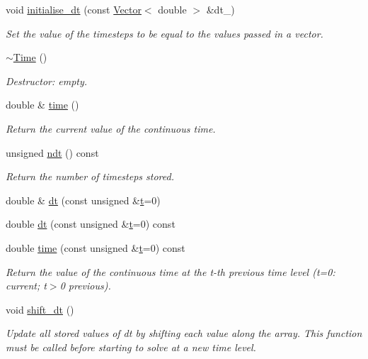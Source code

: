 \begin{DoxyCompactItemize}
void \hyperlink{classoomph_1_1Time_a7c0e382ecec0abb600c36bc5a0820a43}{initialise\+\_\+dt} (const \hyperlink{classoomph_1_1Vector}{Vector}$<$ double $>$ \&dt\+\_\+)
\begin{DoxyCompactList}\small\item\em Set the value of the timesteps to be equal to the values passed in a vector. \end{DoxyCompactList}\item 
\hyperlink{classoomph_1_1Time_aeed85387263214e97be21e075a06371c}{$\sim$\+Time} ()
\begin{DoxyCompactList}\small\item\em Destructor\+: empty. \end{DoxyCompactList}\item 
double \& \hyperlink{classoomph_1_1Time_a6e28ea7a6664a2f5f5e1be871304a2c7}{time} ()
\begin{DoxyCompactList}\small\item\em Return the current value of the continuous time. \end{DoxyCompactList}\item 
unsigned \hyperlink{classoomph_1_1Time_ad40953c471eb3ce59921e6870ed755f3}{ndt} () const
\begin{DoxyCompactList}\small\item\em Return the number of timesteps stored. \end{DoxyCompactList}\item 
double \& \hyperlink{classoomph_1_1Time_a2c684e0a69db7adde90f1f052e424a6b}{dt} (const unsigned \&\hyperlink{cfortran_8h_af6f0bd3dc13317f895c91323c25c2b8f}{t}=0)
\item 
double \hyperlink{classoomph_1_1Time_a4e956b0a5d0ef62ec7be904e66b33133}{dt} (const unsigned \&\hyperlink{cfortran_8h_af6f0bd3dc13317f895c91323c25c2b8f}{t}=0) const
\item 
double \hyperlink{classoomph_1_1Time_a4af91dd6c41ca7defd431bf53c518ba5}{time} (const unsigned \&\hyperlink{cfortran_8h_af6f0bd3dc13317f895c91323c25c2b8f}{t}=0) const
\begin{DoxyCompactList}\small\item\em Return the value of the continuous time at the t-\/th previous time level (t=0\+: current; t$>$0 previous). \end{DoxyCompactList}\item 
void \hyperlink{classoomph_1_1Time_a92ca0ca34a1491744a3315d61d7cee5f}{shift\+\_\+dt} ()
\begin{DoxyCompactList}\small\item\em Update all stored values of dt by shifting each value along the array. This function must be called before starting to solve at a new time level. \end{DoxyCompactList}\end{DoxyCompactItemize}
